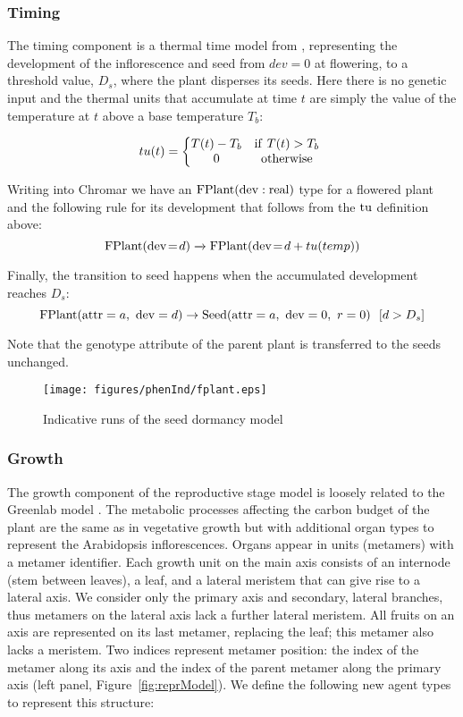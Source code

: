 \subsubsection*{Timing}
\label{timing-1}

The timing component is a thermal time model from
\citet{burghardt_modeling_2015}, representing the development of the
inflorescence and seed from \(dev = 0\) at flowering, to a threshold value,
\(D_{s}\), where the plant disperses its seeds. Here there is no genetic input
and the thermal units that accumulate at time \(t\) are simply the value of the
temperature at \(t\) above a base temperature \(T_{b}\):

\[tu(t) = \left\{ \begin{matrix}
T(t) - T_{b} & \mathrm{if\ }T(t) > T_{b} \\
0 & \mathrm{otherwise} \\
\end{matrix} \right.\ \]

Writing into Chromar we have an
\(\mathrm{FPlant}(\mathrm{dev}:\mathrm{real})\) type for a flowered plant and
the following rule for its development that follows from the
\(\mathrm{tu}\) definition above:
$$
\mathrm{FPlant}( \mathrm{dev} \! = \! {d} ) \xrightarrow{} \mathrm{FPlant}(\mathrm{dev} \! = \! {d + tu(temp)})
$$

Finally, the transition to seed happens when the accumulated development
reaches \(D_{s}\):
\[\mathrm{FPlant}( \mathrm{attr} = a,\mathrm{\ dev} = d ) \rightarrow \mathrm{Seed}( \mathrm{attr} = a,\ \mathrm{dev} = 0,\ r = 0 )\ \ \lbrack d > D_{s}\rbrack\]

Note that the genotype attribute of the parent plant is transferred to
the seeds unchanged.

\begin{figure}
  \centering
  \texttt{[image: figures/phenInd/fplant.eps]}
  \caption{Indicative runs of the seed dormancy model}
  \label{fig:reprInd}
\end{figure}

\subsubsection*{Growth}
\label{growth-1}

The growth component of the reproductive stage model is loosely related to the
Greenlab model \citep{christophe_model-based_2008}. The metabolic processes
affecting the carbon budget of the plant are the same as in vegetative growth
but with additional organ types to represent the Arabidopsis
inflorescences. Organs appear in units (metamers) with a metamer
identifier. Each growth unit on the main axis consists of an internode (stem
between leaves), a leaf, and a lateral meristem that can give rise to a lateral
axis. We consider only the primary axis and secondary, lateral branches, thus
metamers on the lateral axis lack a further lateral meristem. All fruits on an
axis are represented on its last metamer, replacing the leaf; this metamer also
lacks a meristem.  Two indices represent metamer position: the index of the
metamer along its axis and the index of the parent metamer along the primary
axis (left panel, Figure~\ref{fig:reprModel}). We define the following new agent
types to represent this structure:

